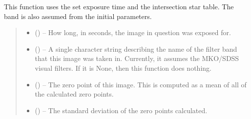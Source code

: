 \documentclass[letterpaper,11pt,english]{sphinxmanual}
\begin{document}
\begin{savenotes}
\begin{fulllineitems}
\begin{savenotes}
\begin{fulllineitems}
\sphinxAtStartPar
This function uses the set exposure time and the intersection star
table. The band is also assumed from the initial parameters.
\begin{quote}\begin{description}
\begin{itemize}
\item {} 
\sphinxAtStartPar
{} () – How long, in seconds, the image in question was exposed for.

\item {} 
\sphinxAtStartPar
{} (\sphinxstyleliteralemphasis{\sphinxupquote{, }}) – A single character string describing the name of the filter band that
this image was taken in. Currently, it assumes the MKO/SDSS visual
filters. If it is None, then this function does nothing.

\end{itemize}

\sphinxAtStartPar
\begin{itemize}
\item {} 
\sphinxAtStartPar
{} () – The zero point of this image. This is computed as a mean of all of
the calculated zero points.

\item {} 
\sphinxAtStartPar
{} () – The standard deviation of the zero points calculated.

\end{itemize}


\end{description}\end{quote}

\end{fulllineitems}\end{savenotes}



\end{fulllineitems}
\end{savenotes}
\end{document}
